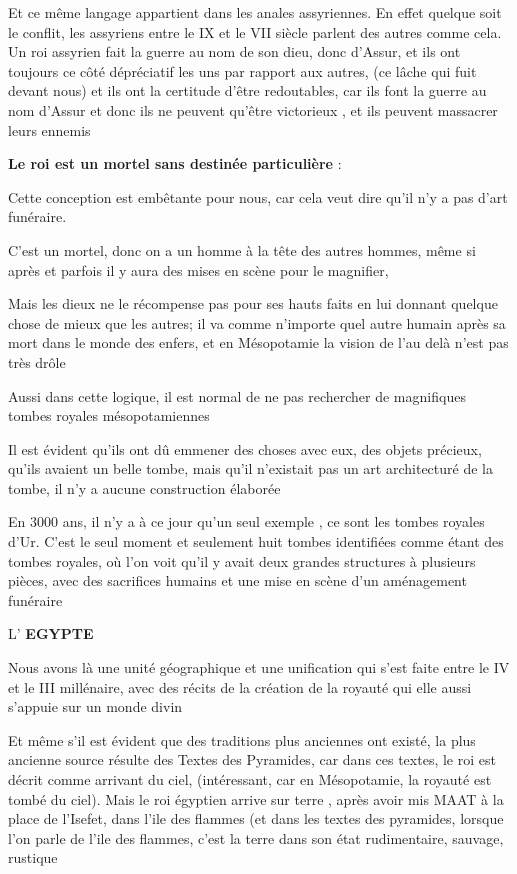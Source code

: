 \documentclass[a4paper,10pt]{article}
\begin{document}
\begin{itemize}
Et ce même langage appartient dans les anales assyriennes. En effet
quelque soit le conflit, les assyriens entre le IX et le VII siècle
parlent des autres comme cela. Un roi assyrien fait la guerre au nom de
son dieu, donc d'Assur, et ils ont toujours ce côté
dépréciatif les uns par rapport aux autres, (ce lâche qui fuit devant
nous) et ils ont la certitude d'être redoutables, car
ils font la guerre au nom d'Assur et donc ils ne
peuvent qu'être victorieux , et ils peuvent massacrer
leurs ennemis

\textbf{Le roi est un mortel sans destinée particulière} : 

Cette conception est embêtante pour nous, car cela veut dire
qu'il n'y a pas
d'art funéraire.

C'est un mortel, donc on a un homme à la tête des
autres hommes, même si après et parfois il y aura des mises en scène
pour le magnifier,  

Mais les dieux ne le récompense pas pour ses hauts faits en lui donnant
quelque chose de mieux que les autres; il va comme
n'importe quel autre humain après sa mort dans le
monde des enfers, et en Mésopotamie la vision de l'au
delà n'est pas très drôle

Aussi dans cette logique, il est normal de ne pas rechercher de
magnifiques tombes royales mésopotamiennes

Il est évident qu'ils ont dû emmener des choses avec
eux,  des objets précieux, qu'ils avaient un belle
tombe, mais qu'il n'existait pas un
art architecturé de la tombe, il n'y a aucune
construction élaborée

En 3000 ans,  il n'y a  à ce jour
qu'un seul exemple , ce sont les tombes royales
d'Ur. C'est le seul moment et
seulement huit tombes identifiées comme étant des tombes royales, où
l'on voit qu'il y avait deux grandes
structures à plusieurs pièces, avec des sacrifices humains et une mise
en scène d'un aménagement funéraire

 L'\textbf{ EGYPTE}

Nous avons là une unité géographique et une unification qui
s'est faite entre le IV et le III millénaire, avec des
récits de la création de la royauté qui elle aussi
s'appuie sur un monde divin

Et même s'il est évident que des traditions plus
anciennes ont existé, la plus ancienne source résulte des Textes des
Pyramides, car dans ces textes, le roi est décrit comme arrivant du
ciel, (intéressant, car en Mésopotamie, la royauté est tombé du ciel).
Mais le roi égyptien arrive sur terre , après avoir mis MAAT à la place
de l'Isefet, dans l'ile des flammes
(et dans les textes des pyramides, lorsque l'on parle
de l'ile des flammes, c'est la terre
dans son état rudimentaire, sauvage, rustique


\end{itemize}
\end{document}

